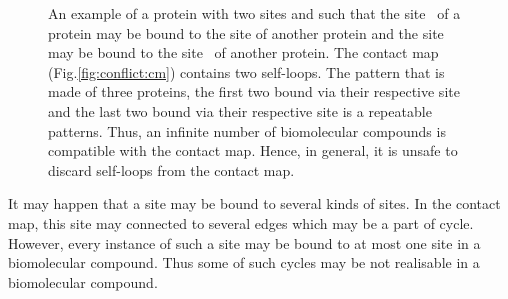\documentclass{entcs}
\begin{document}
\begin{figure}
\caption{An example of a protein with two sites  and  such that the site  of a protein may be bound to the site  of another protein and the site  may be bound to the site  of another protein.
The contact map (Fig.\ref{fig:conflict:cm}) contains two self-loops.
The pattern that is made of three proteins, the first two bound via their respective site  and the last two bound via their respective site
 is a repeatable patterns. Thus, an infinite number of biomolecular compounds is compatible with the contact map. Hence, in general, it is unsafe to discard self-loops from the contact map. }
\end{figure}

It may happen that a site may be bound to several kinds of sites.
In the contact map, this site may connected to several edges which may be a part of cycle. However, every instance of such a site may be bound to at most
one site in a biomolecular compound. Thus some of such cycles may be not realisable in a biomolecular compound.
\end{document}
